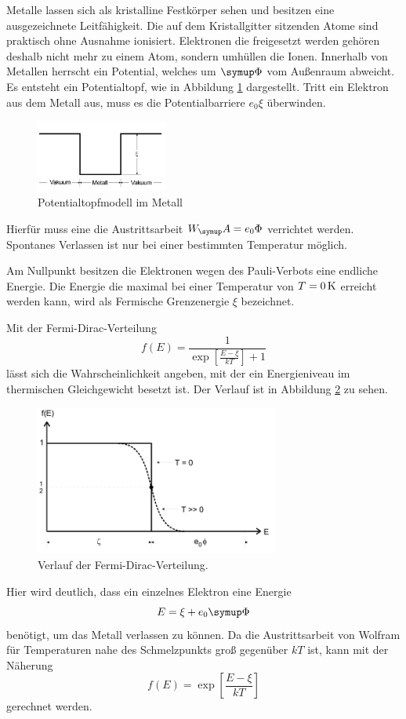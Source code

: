 Metalle lassen sich als kristalline Festkörper sehen und besitzen eine ausgezeichnete
Leitfähigkeit. Die auf dem Kristallgitter sitzenden Atome sind praktisch
ohne Ausnahme ionisiert. Elektronen die freigesetzt werden gehören deshalb nicht
mehr zu einem Atom, sondern umhüllen die Ionen. Innerhalb von Metallen
herrscht ein Potential, welches um $\su{\Phi}$
vom Außenraum abweicht. Es entsteht ein Potentialtopf, wie in Abbildung \ref{topf}
dargestellt.
Tritt ein Elektron aus dem Metall aus, muss es die Potentialbarriere $e_0\xi$ überwinden.

\begin{figure}
  \includegraphics[width=4.3cm]{bilder/topf.jpg}
  \caption{Potentialtopfmodell im Metall \cite{504}}
  \label{topf}
\end{figure}
Hierfür muss eine die Austrittsarbeit $W_\su{A}=e_0\Phi$ verrichtet werden. Spontanes Verlassen ist
nur bei einer bestimmten Temperatur möglich.

Am Nullpunkt besitzen die Elektronen wegen des Pauli-Verbots eine endliche
Energie. Die Energie die maximal bei einer Temperatur von $T=0\,\si{\kelvin}$ erreicht
werden kann, wird als Fermische Grenzenergie $\xi$ bezeichnet.

Mit der Fermi-Dirac-Verteilung
\begin{equation}
  f(E) = \frac{1}{\exp\left[\frac{E-\xi}{kT}\right]+1}
  \label{eqn:fermi}
\end{equation}
lässt sich die Wahrscheinlichkeit angeben, mit der ein Energieniveau im thermischen
Gleichgewicht besetzt ist. Der Verlauf ist in Abbildung \ref{dirac} zu sehen.
\begin{figure}
  \centering
  \includegraphics[width = 8cm]{bilder/dirac.jpg}
  \caption{Verlauf der Fermi-Dirac-Verteilung.\cite{504}}
  \label{dirac}
\end{figure}
Hier wird deutlich, dass ein einzelnes Elektron eine Energie
\begin{equation*}
  E = \xi + e_0\su{\Phi}
\end{equation*}
benötigt, um das Metall verlassen zu können. Da die Austrittsarbeit von Wolfram
für Temperaturen nahe des Schmelzpunkts groß gegenüber $kT$ ist, kann mit
der Näherung
\begin{equation}
  f(E) = \exp\left[\frac{E-\xi}{kT}\right]
  \label{eqn:fermi2}
\end{equation}
gerechnet werden.

